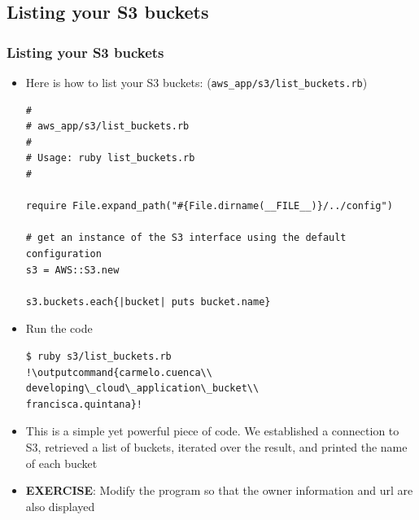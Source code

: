 \documentclass{beamer}
\newcommand{\outputcommand}[1]{\color{darkgreen}{#1}}
\begin{document}
\subsection{Listing your S3 buckets}
\begin{frame}
\frametitle{Listing your S3 buckets}
\begin{itemize}
\item Here is how to list your S3 buckets:  (\texttt{aws\_app/s3/list\_buckets.rb})

\lstset{language=Ruby, style=eclipse}
\begin{lstlisting}[escapechar=!]
#
# aws_app/s3/list_buckets.rb
#
# Usage: ruby list_buckets.rb
#

require File.expand_path("#{File.dirname(__FILE__)}/../config")

# get an instance of the S3 interface using the default configuration
s3 = AWS::S3.new

s3.buckets.each{|bucket| puts bucket.name}
\end{lstlisting}

\item Run the code
\lstset{language=shell}
\begin{lstlisting}[escapechar=!]
$ ruby s3/list_buckets.rb
!\outputcommand{carmelo.cuenca\\
developing\_cloud\_application\_bucket\\
francisca.quintana}!
\end{lstlisting}

\item This is a simple yet powerful piece of code. We established a connection to S3, retrieved a list of buckets, 
iterated over the result, and printed the name of each bucket

\item \textbf{EXERCISE}: Modify the program so that the owner information and url are also displayed
\end{itemize}
\end{frame}
\end{document}
